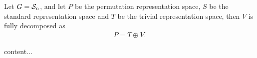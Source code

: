 \begin{example}
	Let $G = \mathcal{S}_n$, and let $P$ be the permutation representation space, $S$ be the standard representation space and $T$ be the trivial representation space, then $V$ is fully decomposed as 
	\begin{align*}
		P = T \oplus V.
	\end{align*}
\end{example}


\begin{theorem}
	content...
\end{theorem}


%	
	
